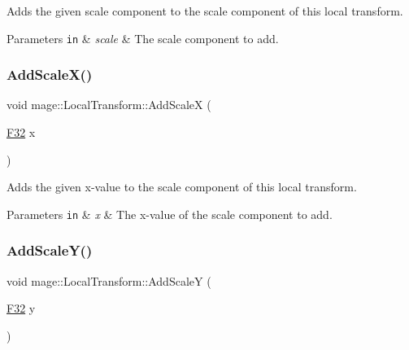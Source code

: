 Adds the given scale component to the scale component of this local transform.


\begin{DoxyParams}[1]{Parameters}
\mbox{\tt in}  & {\em scale} & The scale component to add. \\
\hline
\end{DoxyParams}
\mbox{\label{classmage_1_1_local_transform_a5b3bdbe95a1b531271a122d1fe26f0a6}} 
\subsubsection{\texorpdfstring{Add\+Scale\+X()}{AddScaleX()}}
{\footnotesize\ttfamily void mage\+::\+Local\+Transform\+::\+Add\+ScaleX (\begin{DoxyParamCaption}\item[{\mbox{\hyperlink{namespacemage_aa97e833b45f06d60a0a9c4fc22ae02c0}{F32}}}]{x }\end{DoxyParamCaption})\hspace{0.3cm}{\ttfamily [noexcept]}}

Adds the given x-\/value to the scale component of this local transform.


\begin{DoxyParams}[1]{Parameters}
\mbox{\tt in}  & {\em x} & The x-\/value of the scale component to add. \\
\hline
\end{DoxyParams}
\mbox{\label{classmage_1_1_local_transform_abd8826a904947b5934ba6afef3b3826f}} 
\subsubsection{\texorpdfstring{Add\+Scale\+Y()}{AddScaleY()}}
{\footnotesize\ttfamily void mage\+::\+Local\+Transform\+::\+Add\+ScaleY (\begin{DoxyParamCaption}\item[{\mbox{\hyperlink{namespacemage_aa97e833b45f06d60a0a9c4fc22ae02c0}{F32}}}]{y }\end{DoxyParamCaption})\hspace{0.3cm}{\ttfamily [noexcept]}}

